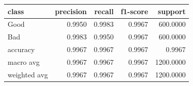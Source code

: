 \begin{tabular}{lrrrr}
\toprule
class & precision & recall & f1-score & support \\
\midrule
Good & 0.9950 & 0.9983 & 0.9967 & 600.0000 \\
Bad & 0.9983 & 0.9950 & 0.9967 & 600.0000 \\
accuracy & 0.9967 & 0.9967 & 0.9967 & 0.9967 \\
macro avg & 0.9967 & 0.9967 & 0.9967 & 1200.0000 \\
weighted avg & 0.9967 & 0.9967 & 0.9967 & 1200.0000 \\
\bottomrule
\end{tabular}
